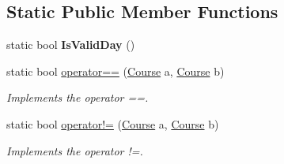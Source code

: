 \subsection*{Static Public Member Functions}
\begin{DoxyCompactItemize}
\item 
static bool {\bfseries Is\+Valid\+Day} ()\hypertarget{class_w_c_c_mobile_1_1_course_a40949f04e471ee508966ed89fa2121ed}{}\label{class_w_c_c_mobile_1_1_course_a40949f04e471ee508966ed89fa2121ed}

\item 
static bool \hyperlink{class_w_c_c_mobile_1_1_course_ad54f1767a2bd3a2622f966fdfe82da3d}{operator==} (\hyperlink{class_w_c_c_mobile_1_1_course}{Course} a, \hyperlink{class_w_c_c_mobile_1_1_course}{Course} b)
\begin{DoxyCompactList}\small\item\em Implements the operator ==. \end{DoxyCompactList}\item 
static bool \hyperlink{class_w_c_c_mobile_1_1_course_aae1d71acaa74e02062180e6226ec68c4}{operator!=} (\hyperlink{class_w_c_c_mobile_1_1_course}{Course} a, \hyperlink{class_w_c_c_mobile_1_1_course}{Course} b)
\begin{DoxyCompactList}\small\item\em Implements the operator !=. \end{DoxyCompactList}\end{DoxyCompactItemize}

